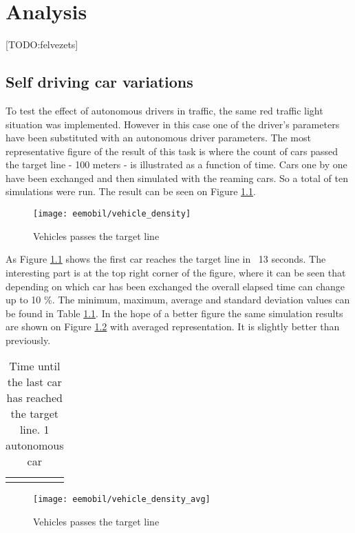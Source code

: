 \chapter{Analysis}
	[TODO:felvezets]
	\section{Self driving car variations}
		To test the effect of autonomous drivers in traffic, the same red traffic light situation was implemented. However in this case one of the driver's parameters have been substituted with an autonomous driver parameters. The most representative figure of the result of this task is where the count of cars passed the target line - 100 meters - is illustrated as a function of time. Cars one by one have been exchanged and then simulated with the reaming cars. So a total of ten simulations were run. The result can be seen on Figure \ref{fig:vehicle_density}.
		\begin{figure}[ht]
			\centering
			\texttt{[image: eemobil/vehicle\_density]}
			\caption{Vehicles passes the target line}
			\label{fig:vehicle_density}
		\end{figure}

		As Figure \ref{fig:vehicle_density} shows the first car reaches the target line in ~13 seconds. The interesting part is at the top right corner of the figure, where it can be seen that depending on which car has been exchanged the overall elapsed time can change up to 10 \%. The minimum, maximum, average and standard deviation values can be found in Table \ref{tab:vehicle_density_minmaxavg_case1}.
		In the hope of a better figure the same simulation results are shown on Figure \ref{fig:vehicle_density_avg} with averaged representation. It is slightly better than previously.
		\begin{table}[ht]
			\begin{center}
				\begin{tabular}{ |c|c|c|c|}
					\hline
					\vehicledensitytable{1}
					\hline
				\end{tabular}
			\end{center}
			\caption{Time until the last car has reached the target line. 1 autonomous car}
			\label{tab:vehicle_density_minmaxavg_case1}
		\end{table}
		\begin{figure}[ht]
			\centering
			\texttt{[image: eemobil/vehicle\_density\_avg]}
			\caption{Vehicles passes the target line}
			\label{fig:vehicle_density_avg}
		\end{figure}
		
